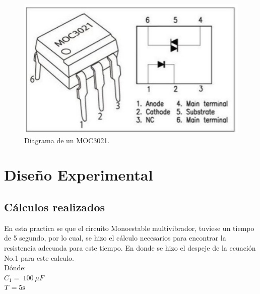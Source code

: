 \documentclass[osajnl,twocolumn,showpacs,superscriptaddress,10pt]{revtex4-1}
\begin{document}
\begin{figure}[H]
\centering
\includegraphics[width = \columnwidth]{Fig_3.png}
\caption{Diagrama de un MOC3021.}
\end{figure}


\section{Diseño Experimental}

    



\subsection{Cálculos realizados}

En esta practica se que el circuito Monoestable multivibrador, tuviese un tiempo de 5 segundo, por lo cual, se hizo el cálculo necesarios para encontrar la resistencia adecuada para este tiempo. En donde se hizo el despeje de la ecuación No.1 para este calculo.\\

Dónde:\\
$C_{1} = \ 100 \ \mu F$\\
$T = 5 \textup{s}$\\
\end{document}

